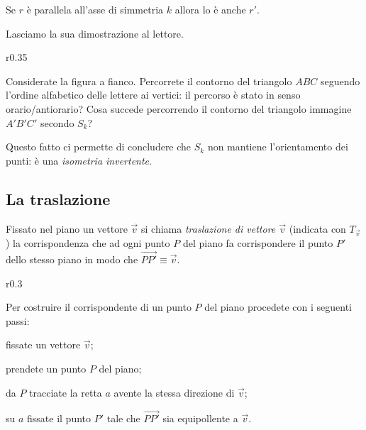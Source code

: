 \begin{teorema}\label{teo:8.5}
Se \(r\) è parallela all'asse di simmetria \(k\) allora lo è anche \(r'\).
\end{teorema}

Lasciamo la sua dimostrazione al lettore.

\setlength{\intextsep}{3pt plus 2.0pt minus 2.0pt}
\begin{wrapfigure}{r}{0.35\textwidth}
  \centering
\end{wrapfigure}
Considerate la figura a fianco. Percorrete il contorno del triangolo 
\(ABC\) seguendo l'ordine alfabetico delle lettere ai vertici: il 
percorso è stato in senso orario/antiorario? Cosa succede percorrendo 
il contorno del triangolo immagine \(A'B'C'\) secondo \(S_k\)?

Questo fatto ci permette di concludere che \(S_k\) non mantiene 
l'orientamento dei punti: è una \emph{isometria invertente}.

\subsection{La traslazione}

\begin{definizione}
Fissato nel piano un vettore \(\vec{v}\) si chiama \emph{traslazione di 
vettore \(\vec{v}\)} (indicata con \(T_{\vec{v}}\)) la corrispondenza che 
ad ogni punto \(P\) del piano fa corrispondere il punto \(P'\) dello 
stesso piano in modo che 
\(\overset{\longrightarrow}{PP'}\equiv\vec{v}\).
\end{definizione}

\setlength{\intextsep}{3pt plus 2.0pt minus 2.0pt}
\begin{wrapfigure}{r}{0.3\textwidth}
  \centering
\end{wrapfigure}
Per costruire il corrispondente di un punto \(P\) del piano procedete 
con i seguenti passi:
\begin{enumerate*}
\item fissate un vettore \(\vec{v}\);
\item prendete un punto \(P\) del piano;
\item da \(P\) tracciate la retta \(a\) avente la stessa direzione di 
\(\vec{v}\);
\item su \(a\) fissate il punto \(P'\) tale che \(\overrightarrow{PP'}\) 
sia equipollente a \(\vec{v}\).
\end{enumerate*}

